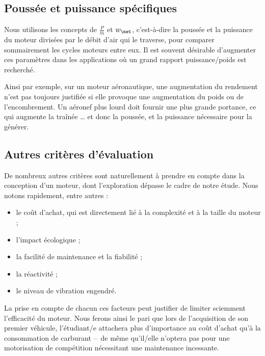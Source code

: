 	\subsection{Poussée et puissance spécifiques}
	\label{ch_poussee_puissance_specifiques}

		Nous utilisons les concepts de  $\frac{P}{\dot m}$ et  $w_\net$, c’est-à-dire la poussée et la puissance du moteur divisées par le débit d’air qui le traverse, pour comparer sommairement les cycles moteurs entre eux. Il est souvent désirable d’augmenter ces paramètres dans les applications où un grand rapport puissance/poids est recherché.

		Ainsi par exemple, sur un moteur aéronautique, une augmentation du rendement n’est pas toujours justifiée si elle provoque une augmentation du poids ou de l’encombrement. Un aéronef plus lourd doit fournir une plus grande portance, ce qui augmente la traînée … et donc la poussée, et la puissance nécessaire pour la générer.

	
	\subsection{Autres critères d’évaluation}
	
		De nombreux autres critères sont naturellement à prendre en compte dans la conception d’un moteur, dont l’exploration dépasse le cadre de notre étude. Nous notons rapidement, entre autres :
		
		\begin{itemize}
			\item le coût d’achat, qui est directement lié à la complexité et à la taille du moteur ;
			\item l’impact écologique ;
			\item la facilité de maintenance et la fiabilité ;
			\item la réactivité ;
			\item le niveau de vibration engendré.
		\end{itemize}

		La prise en compte de chacun ces facteurs peut justifier de limiter sciemment l’efficacité du moteur. Nous ferons ainsi le pari que lors de l’acquisition de son premier véhicule, l’étudiant/e attachera plus d’importance au coût d’achat qu’à la consommation de carburant --\ de même qu’il/\-elle n’optera pas pour une motorisation de compétition nécessitant une maintenance incessante.
		
